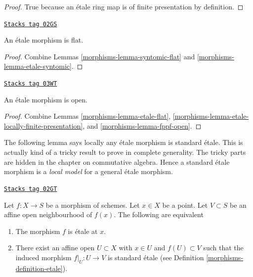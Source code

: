 \begin{proof}
True because an \'etale ring map is of finite presentation by
definition.
\end{proof}

\begin{lemma}
\label{morphisms-lemma-etale-flat}
\href{https://stacks.math.columbia.edu/tag/02GS}{\texttt{Stacks tag 02GS}}

An \'etale morphism is flat.
\end{lemma}

\begin{proof}

Combine Lemmas \ref{morphisms-lemma-syntomic-flat} and \ref{morphisms-lemma-etale-syntomic}.
\end{proof}

\begin{lemma}
\label{morphisms-lemma-etale-open}
\href{https://stacks.math.columbia.edu/tag/03WT}{\texttt{Stacks tag 03WT}}

An \'etale morphism is open.
\end{lemma}

\begin{proof}

Combine Lemmas \ref{morphisms-lemma-etale-flat},
\ref{morphisms-lemma-etale-locally-finite-presentation}, and
\ref{morphisms-lemma-fppf-open}.
\end{proof}

The following lemma says locally any \'etale morphism is standard \'etale.
This is actually kind of a tricky result to prove in complete generality.
The tricky parts are hidden in the chapter on commutative algebra.
Hence a standard \'etale morphism is a {\it local model} for a general
\'etale morphism.

\begin{lemma}
\label{morphisms-lemma-etale-locally-standard-etale}
\href{https://stacks.math.columbia.edu/tag/02GT}{\texttt{Stacks tag 02GT}}

Let $f : X  \to S$ be a morphism of schemes.
Let $x \in X$ be a point.
Let $V \subset S$ be an affine open neighbourhood of $f(x)$.
The following are equivalent
\begin{enumerate}
\item The morphism $f$ is \'etale at $x$.
\item There exist an affine open $U \subset X$ with
$x \in U$ and $f(U) \subset V$ such that the
induced morphism $f|_U : U \to V$ is standard \'etale
(see Definition \ref{morphisms-definition-etale}).
\end{enumerate}
\end{lemma}

